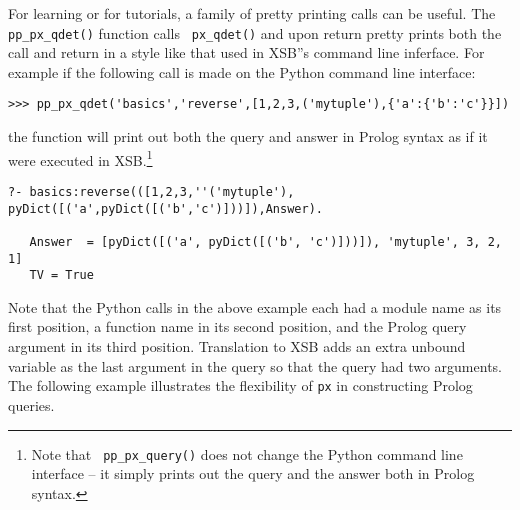 \begin{example}
For learning \px{} or for tutorials, a family of pretty printing calls
can be useful.  The {\tt pp\_px\_qdet()} function calls {\tt
  px\_qdet()} and upon return pretty prints both the call and return
in a style like that used in XSB''s command line inferface.  For
example if the following call is made on the Python command line
interface:

\begin{verbatim}
>>> pp_px_qdet('basics','reverse',[1,2,3,('mytuple'),{'a':{'b':'c'}}])
\end{verbatim}
\noindent
the function will print out both the query and answer in Prolog syntax
as if it were executed in XSB.\footnote{Note that {\tt
    pp\_px\_query()} does not change the Python command line interface
  -- it simply prints out the query and the answer both in Prolog
  syntax.}

\begin{verbatim}
?- basics:reverse(([1,2,3,''('mytuple'), pyDict([('a',pyDict([('b','c')]))]),Answer).

   Answer  = [pyDict([('a', pyDict([('b', 'c')]))]), 'mytuple', 3, 2, 1]
   TV = True
\end{verbatim}
\end{example}

Note that the Python calls in the above example each had a module name
as its first position, a function name in its second position, and the
Prolog query argument in its third position.  Translation to XSB adds
an extra unbound variable as the last argument in the query so that
the query had two arguments.  The following example illustrates the
flexibility of {\tt px} in constructing Prolog queries.

